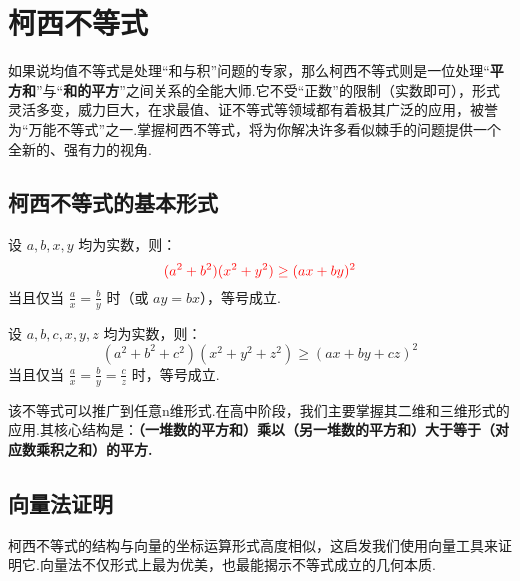\section{柯西不等式}

如果说均值不等式是处理“和与积”问题的专家，那么柯西不等式则是一位处理“\textbf{平方和}”与“\textbf{和的平方}”之间关系的全能大师.它不受“正数”的限制（实数即可），形式灵活多变，威力巨大，在求最值、证不等式等领域都有着极其广泛的应用，被誉为“万能不等式”之一.掌握柯西不等式，将为你解决许多看似棘手的问题提供一个全新的、强有力的视角.


\subsection{柯西不等式的基本形式}

\begin{theorem}[柯西不等式二维形式]
	设 $a, b, x, y$ 均为实数，则：
	\begin{equation}
		\textcolor{red}{(a^2+b^2)(x^2+y^2) \ge (ax+by)^2}
	\end{equation}
	当且仅当 $\frac{a}{x} = \frac{b}{y}$ 时（或 $ay=bx$），等号成立.
\end{theorem}

\begin{theorem}[柯西不等式三维形式]
	设 $a, b, c, x, y, z$ 均为实数，则：
	\begin{equation}
		(a^2+b^2+c^2)(x^2+y^2+z^2) \ge (ax+by+cz)^2
	\end{equation}
	当且仅当 $\frac{a}{x} = \frac{b}{y} = \frac{c}{z}$ 时，等号成立.
\end{theorem}

\begin{note}
	该不等式可以推广到任意n维形式.在高中阶段，我们主要掌握其二维和三维形式的应用.其核心结构是：\textbf{（一堆数的平方和）乘以（另一堆数的平方和）大于等于（对应数乘积之和）的平方.}
\end{note}

\subsection{向量法证明}

\textcolor{green!50!black}{柯西不等式的结构与向量的坐标运算形式高度相似，这启发我们使用向量工具来证明它.向量法不仅形式上最为优美，也最能揭示不等式成立的几何本质.}

